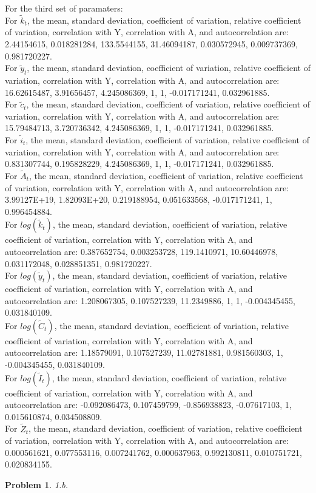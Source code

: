 \documentclass{amsart}
\theoremstyle{plain}
\newtheorem{problem}{Problem}
\begin{document}
For the third set of paramaters:\\
For $\tilde{k}_t$, the mean, standard deviation, coefficient of variation, relative coefficient of variation, correlation with Y, correlation with A, and autocorrelation are: 2.44154615,	0.018281284,	133.5544155,	31.46094187,	0.030572945,	0.009737369,	0.981720227.\\
For $\tilde{y}_t$, the mean, standard deviation, coefficient of variation, relative coefficient of variation, correlation with Y, correlation with A, and autocorrelation are: 16.62615487,	3.91656457,	4.245086369,	1,	1,	-0.017171241,	0.032961885.
\\
For $\tilde{c}_t$, the mean, standard deviation, coefficient of variation, relative coefficient of variation, correlation with Y, correlation with A, and autocorrelation are: 15.79484713,	3.720736342,	4.245086369,	1,	1,	-0.017171241,	0.032961885.
\\
For $\tilde{i}_t$, the mean, standard deviation, coefficient of variation, relative coefficient of variation, correlation with Y, correlation with A, and autocorrelation are: 0.831307744,	0.195828229,	4.245086369,	1,	1,	-0.017171241,	0.032961885.\\
For $\tilde{A}_t$, the mean, standard deviation, coefficient of variation, relative coefficient of variation, correlation with Y, correlation with A, and autocorrelation are: 3.99127E+19,	1.82093E+20,	0.219188954,	0.051633568,	-0.017171241,	1,	0.996454884.\\
For $log(\tilde{k}_t)$, the mean, standard deviation, coefficient of variation, relative coefficient of variation, correlation with Y, correlation with A, and autocorrelation are: 0.387652754,	0.003253728,	119.1410971,	10.60446978,	0.031172048,	0.028851351,	0.981720227.\\
For $log(\tilde{y}_t)$, the mean, standard deviation, coefficient of variation, relative coefficient of variation, correlation with Y, correlation with A, and autocorrelation are: 1.208067305,	0.107527239,	11.2349886,	1,	1,	-0.004345455,	0.031840109.\\
For $log(\tilde{C}_t)$, the mean, standard deviation, coefficient of variation, relative coefficient of variation, correlation with Y, correlation with A, and autocorrelation are: 1.18579091,	0.107527239,	11.02781881,	0.981560303,	1,	-0.004345455,	0.031840109.\\
For $log(\tilde{I}_t)$, the mean, standard deviation, coefficient of variation, relative coefficient of variation, correlation with Y, correlation with A, and autocorrelation are: -0.092086473,	0.107459799,	-0.856938823,	-0.07617103,	1,	0.015610874,	0.034508809.\\
For $\tilde{Z}_t$, the mean, standard deviation, coefficient of variation, relative coefficient of variation, correlation with Y, correlation with A, and autocorrelation are: 0.000561621,	0.077553116,	0.007241762,	0.000637963,	0.992130811,	0.010751721,	0.020834155.\\
\begin{problem}
1.b.
\end{problem}
\end{document}
